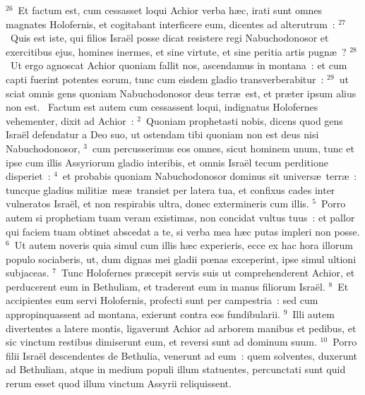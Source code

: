 ${}^{26}$~Et factum est, cum cessasset loqui Achior verba h\ae c, irati sunt omnes magnates Holofernis, et cogitabant interficere eum, dicentes ad alterutrum~:
${}^{27}$~Quis est iste, qui filios Isra\"el posse dicat resistere regi Nabuchodonosor et exercitibus ejus, homines inermes, et sine virtute, et sine peritia artis pugn\ae~?
${}^{28}$~Ut ergo agnoscat Achior quoniam fallit nos, ascendamus in montana~: et cum capti fuerint potentes eorum, tunc cum eisdem gladio transverberabitur~:
${}^{29}$~ut sciat omnis gens quoniam Nabuchodonosor deus terr\ae\ est, et pr\ae ter ipsum alius non est.
~Factum est autem cum cessassent loqui, indignatus Holofernes vehementer, dixit ad Achior~:
${}^{2}$~Quoniam prophetasti nobis, dicens quod gens Isra\"el defendatur a Deo suo, ut ostendam tibi quoniam non est deus nisi Nabuchodonosor,
${}^{3}$~cum percusserimus eos omnes, sicut hominem unum, tunc et ipse cum illis Assyriorum gladio interibis, et omnis Isra\"el tecum perditione disperiet~:
${}^{4}$~et probabis quoniam Nabuchodonosor dominus sit univers\ae\ terr\ae~: tuncque gladius militi\ae\ me\ae\ transiet per latera tua, et confixus cades inter vulneratos Isra\"el, et non respirabis ultra, donec extermineris cum illis.
${}^{5}$~Porro autem si prophetiam tuam veram existimas, non concidat vultus tuus~: et pallor qui faciem tuam obtinet abscedat a te, si verba mea h\ae c putas impleri non posse.
${}^{6}$~Ut autem noveris quia simul cum illis h\ae c experieris, ecce ex hac hora illorum populo sociaberis, ut, dum dignas mei gladii pœnas exceperint, ipse simul ultioni subjaceas.
${}^{7}$~Tunc Holofernes pr\ae cepit servis suis ut comprehenderent Achior, et perducerent eum in Bethuliam, et traderent eum in manus filiorum Isra\"el.
${}^{8}$~Et accipientes eum servi Holofernis, profecti sunt per campestria~: sed cum appropinquassent ad montana, exierunt contra eos fundibularii.
${}^{9}$~Illi autem divertentes a latere montis, ligaverunt Achior ad arborem manibus et pedibus, et sic vinctum restibus dimiserunt eum, et reversi sunt ad dominum suum.
${}^{10}$~Porro filii Isra\"el descendentes de Bethulia, venerunt ad eum~: quem solventes, duxerunt ad Bethuliam, atque in medium populi illum statuentes, percunctati sunt quid rerum esset quod illum vinctum Assyrii reliquissent.


